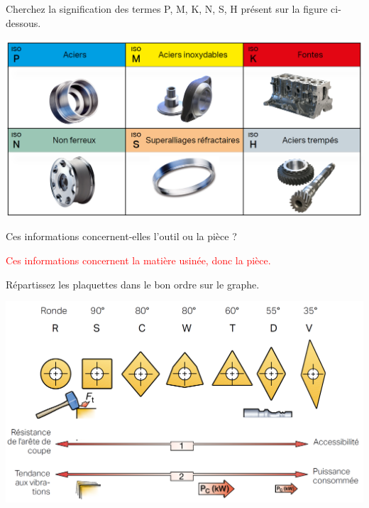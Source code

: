 \documentclass[12pt,a4paper]{article} %
\begin{document}
\newpage


\begin{exo} Cherchez la signification des termes P, M, K, N, S, H présent sur la figure ci-dessous. \end{exo}
\begin{center}
\includegraphics[width=0.8\linewidth]{CORR5.png}
\end{center}


\begin{exo} Ces informations concernent-elles l'outil ou la pièce ? \end{exo}



\textcolor{red}{Ces informations concernent la matière usinée, donc la pièce.}


\newpage


\begin{exo} Répartissez les plaquettes dans le bon ordre sur le graphe. \end{exo}
\begin{center}
\includegraphics[width=0.85\linewidth]{CORR6.png}
\end{center}
\end{document}
